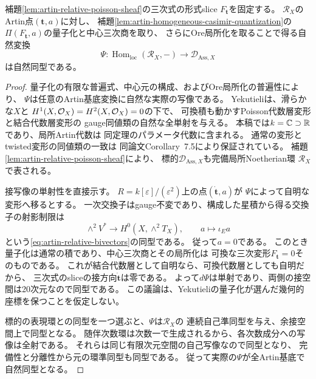 \begin{lemma}[構成した中心商族と代数層変形関手]
\label{lem:artin-constructed-family-comparison}
補題\ref{lem:artin-relative-poisson-sheaf}の三次式の形式slice
$F_{\boldsymbol t}$を固定する。
$\mathcal R_X$のArtin点$(\boldsymbol t,a)$に対し、
補題\ref{lem:artin-homogeneous-casimir-quantization}の
$\Pi(F_{\boldsymbol t},a)$の量子化と中心三次商を取り、
さらにOre局所化を取ることで得る自然変換
\[
 \Psi:\operatorname{Hom}_{\mathrm{loc}}(\mathcal R_X,-)
       \longrightarrow\mathcal D_{\mathrm{Ass},X}
\]
は自然同型である。
\end{lemma}
\begin{proof}
量子化の有限な普遍式、中心元の構成、およびOre局所化の普遍性により、
$\Psi$は任意のArtin基底変換に自然な実際の写像である。
Yekutieli\cite[Corollary~11.2]{YekutieliTwisted}は、滑らかな$X$と
$H^1(X,\mathcal O_X)=H^2(X,\mathcal O_X)=0$の下で、
可換積も動かすPoisson代数層変形と結合代数層変形の
gauge同値類の自然な全単射を与える。
本稿では$k=\mathbb C\supset\mathbb R$であり、局所Artin代数は
同定理のパラメータ代数に含まれる。
通常の変形とtwisted変形の同値類の一致は
同論文Corollary~7.5により保証されている。
補題\ref{lem:artin-relative-poisson-sheaf}により、
標的$\mathcal D_{\mathrm{Ass},X}$も完備局所Noetherian環
$\mathcal R_X$で表される。

接写像の単射性を直接示す。
$R=k[\varepsilon]/(\varepsilon^2)$上の点$(\dot{\boldsymbol t},a)$が
$\Psi$によって自明な変形へ移るとする。
一次交換子はgauge不変であり、構成した星積から得る交換子の射影制限は
\[
 \wedge^2V^*\longrightarrow H^0(X,\wedge^2T_X),
 \qquad a\longmapsto\iota_Ea
\]
という\eqref{eq:artin-relative-bivectors}の同型である。
従って$a=0$である。
このとき量子化は通常の積であり、中心三次商とその局所化は
可換な三次変形$F_{\boldsymbol t}=0$そのものである。
これが結合代数層として自明なら、可換代数層としても自明だから、
三次式のsliceの接方向$\dot{\boldsymbol t}$は零である。
よって$d\Psi$は単射であり、両側の接空間は20次元なので同型である。
この議論は、Yekutieliの量子化が選んだ幾何的座標を保つことを仮定しない。

標的の表現環との同型を一つ選ぶと、$\Psi$は$\mathcal R_X$の
連続自己準同型を与え、余接空間上で同型となる。
随伴次数環は次数一で生成されるから、各次数成分への写像は全射である。
それらは同じ有限次元空間の自己写像なので同型となり、
完備性と分離性から元の環準同型も同型である。
従って実際の$\Psi$が全Artin基底で自然同型となる。
\end{proof}

